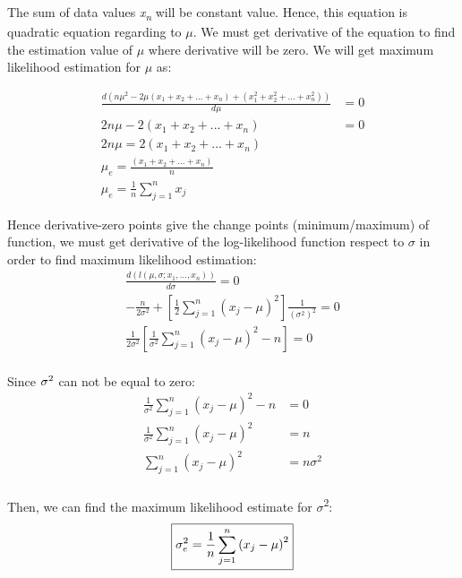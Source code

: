\documentclass{article}
\newcommand{\writex}[2]{{\it{#1\textsubscript#2}}}
\begin{document}
The sum of data values \writex{x}{n} will be constant value. Hence, this equation is quadratic equation regarding to $\mu$. We must get derivative of the equation to find the estimation value of $\mu$ where derivative will be zero. We will get maximum likelihood estimation for $\mu$ as:

\begin{equation*}
	\begin{aligned}
	\frac{d\left(n\mu^{2} -2\mu(x_1+x_2+...+x_n) + (x_1^{2}+x_2^{2}+...+x_n^{2})\right)}{d\mu} &= 0 \\
	2n\mu -2(x_1+x_2+...+x_n) &= 0 \\
	2n\mu = 2(x_1+x_2+...+x_n) \\
	\mu_e = \frac{(x_1+x_2+...+x_n)}{n} \\
	\boxed{\mu_e = \frac{1}{n}\sum_{j=1}^{n}x_j}
	\end{aligned}
\end{equation*}

Hence derivative-zero points give the change points (minimum/maximum) of function, we must get derivative of the log-likelihood function respect to $\sigma$ in order to find maximum likelihood estimation: 
\begin{equation*}
	\begin{aligned}
	\frac{d\left(l\left(\mu,\sigma;x_1,...,x_n\right)\right)}{d\sigma} = 0 \\
	-\frac{n}{2\sigma^{2}}+\left[\frac{1}{2}\sum_{j=1}^{n}\left(x_j-\mu\right)^{2}\right]\frac{1}{\left(\sigma^{2}\right)^{2}} = 0\\
	\frac{1}{2\sigma^{2}}\left[\frac{1}{\sigma^{2}}\sum_{j=1}^{n}\left(x_j-\mu\right)^{2}-n\right] = 0 \\
	\end{aligned}
\end{equation*}

Since $\sigma\textsuperscript{2}$ can not be equal to zero:
\begin{equation*}
	\begin{aligned}
	\frac{1}{\sigma^{2}}\sum_{j=1}^{n}\left(x_j-\mu\right)^{2}-n &= 0\\
	\frac{1}{\sigma^{2}}\sum_{j=1}^{n}\left(x_j-\mu\right)^{2} &= n\\
	\sum_{j=1}^{n}\left(x_j-\mu\right)^{2} &= n\sigma^{2}\\
	\end{aligned}
\end{equation*}

Then, we can find the maximum likelihood estimate for $\sigma$\textsuperscript{2}:
\begin{equation*}
	\boxed{\sigma_e^{2} = \frac{1}{n}\sum_{j=1}^{n}\left(x_j-\mu\right)^{2}} \\
\end{equation*}
\end{document}
